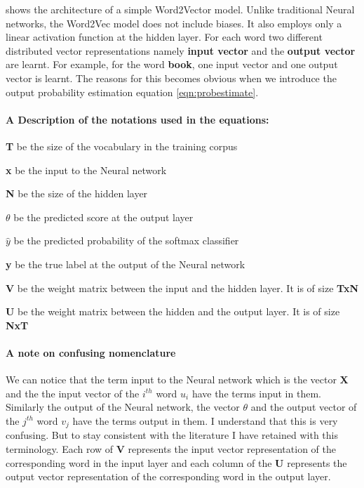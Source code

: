  shows the architecture of a simple Word2Vector model. Unlike traditional Neural networks, the Word2Vec model does not include biases. It also employs only a linear activation function at the hidden layer. For each word two different distributed vector representations namely \textbf{input vector}  and the \textbf{output vector} are learnt. For example, for the word \textbf{book}, one input vector and one output vector is learnt. The reasons for this becomes obvious when we introduce the output probability estimation equation \ref{eqn:probestimate}. 

\paragraph*{A Description of the notations used in the equations:}
\begin{myitemize}
    \item \textbf{T} be the size of the vocabulary in the training corpus
    \item \textbf{x} be the input to the Neural network
    \item \textbf{N} be the size of the hidden layer
    \item \textbf{$\theta$} be the predicted score at the output layer
    \item \textbf{$\hat{y}$} be the predicted probability of the softmax classifier
    \item \textbf{y} be the true label at the output of the Neural network
    \item \textbf{V} be the weight matrix between the input and the hidden layer. It is of size \textbf{TxN}
    \item \textbf{U} be the weight matrix between the hidden and the output layer. It is of size \textbf{NxT}
\end{myitemize}

\paragraph*{A note on confusing nomenclature}
We can notice that the term input to the Neural network which is the vector \textbf{X} and the the input vector of the $i^{th}$ word \textbf{$u_i$} have the terms input in them. Similarly the output of the Neural network, the vector \textbf{$\theta$} and the output vector of the $j^{th}$ word \textbf{$v_j$} have the terms output in them. I understand that this is very confusing. But to stay consistent with the literature I have retained with this terminology. Each row of \textbf{V} represents the input vector representation of the corresponding word in the input layer and each column of the \textbf{U} represents the output vector representation of the corresponding word in the output layer. 

